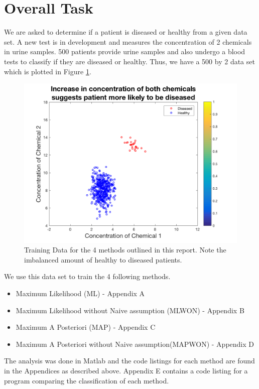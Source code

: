 \section{Overall Task}
We are asked to determine if a patient is diseased or healthy from a given data set. A new test is in development and measures the concentration of 2 chemicals in urine samples. 500 patients provide urine samples and also undergo a blood tests to classify if they are diseased or healthy. Thus, we have a 500 by 2 data set which is plotted in Figure \ref{fig:trainingData}. 

\begin{figure}[h]
	\centering
	\includegraphics[width=0.8\linewidth]{images/MLtrainingData}
	\caption{Training Data for the 4 methods outlined in this report. Note the imbalanced amount of healthy to diseased patients.}
	\label{fig:trainingData}
\end{figure}

We use this data set to train the 4 following methods. 

\begin{itemize}
	\item Maximum Likelihood (ML) - Appendix A
	\item Maximum Likelihood without Naive assumption (MLWON) - Appendix B
	\item Maximum A Posteriori (MAP) - Appendix C
	\item Maximum A Posteriori without Naive assumption(MAPWON) - Appendix D
\end{itemize}

The analysis was done in Matlab and the code listings for each method are found in the Appendices as described above. Appendix E contains a code listing for a program comparing the classification of each method.

